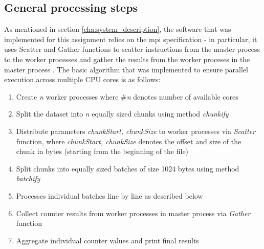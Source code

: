 \documentclass[paper=a4, fontsize=11pt]{scrartcl}
\numberwithin{equation}{section}		%
\numberwithin{figure}{section}			%
\numberwithin{table}{section}				%
\begin{document}
\subsection{General processing steps}
As mentioned in section \ref{cha:system_description}, the software that was implemented for this assignment relies on the \acrfull{mpi} specification - in particular, it uses Scatter and Gather functions to scatter instructions from the master process to the worker processes and gather the results from the worker proceses in the master process \citep{RN312}. The basic algorithm that was implemented to ensure parallel execution across multiple CPU cores is as follows:
\begin{enumerate}
  \item Create \emph{n} worker processes where \#\emph{n} denotes number of available cores
  \item Split the dataset into \emph{n} equally sized chunks using method \emph{chunkify}
  \item Distribute parameters \emph{chunkStart, chunkSize} to worker processes via \emph{Scatter} function, where \emph{chunkStart, chunkSize} denotes the offset and size of the chunk in bytes (starting from the beginning of the file)
  \item Split chunks into equally sized batches of size 1024 bytes using method \emph{batchify}
  \item Processes individual batches line by line as described below
  \item Collect counter results from worker processes in master process via \emph{Gather} function
  \item Aggregate individual counter values and print final results
\end{enumerate}
\end{document}
